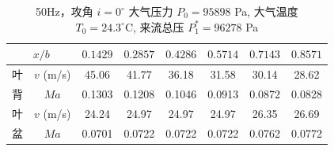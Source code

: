 \begin{table}[H]
  \centering
  \caption[50Hz 攻角 $i=0^\circ$ v/Ma 数据]{50Hz，攻角 $i=0^\circ$ 大气压力 $P_0=95898$ Pa, 大气温度 $T_0=24.3^\circ\text{C}$, 来流总压 $P_1^*=96278$ Pa}
  \label{tab:exp4_vma_50Hz_0}
  \renewcommand{\arraystretch}{1.2}
  \begin{tabular}{cccccccc}
    \toprule
    \multicolumn{2}{c}{$x/b$} & $0.1429$ & $0.2857$ & $0.4286$ & $0.5714$ & $0.7143$ & $0.8571$ \\
    \midrule
    叶 & $v$ (m/s) & 45.06 & 41.77 & 36.18 & 31.58 & 30.14 & 28.62 \\
    背 & $Ma$ & 0.1303 & 0.1208 & 0.1046 & 0.0913 & 0.0872 & 0.0828 \\
    \midrule
    叶 & $v$ (m/s) & 24.24 & 24.97 & 24.97 & 24.97 & 26.35 & 26.69 \\
    盆 & $Ma$ & 0.0701 & 0.0722 & 0.0722 & 0.0722 & 0.0762 & 0.0772 \\
    \bottomrule
  \end{tabular}
\end{table}